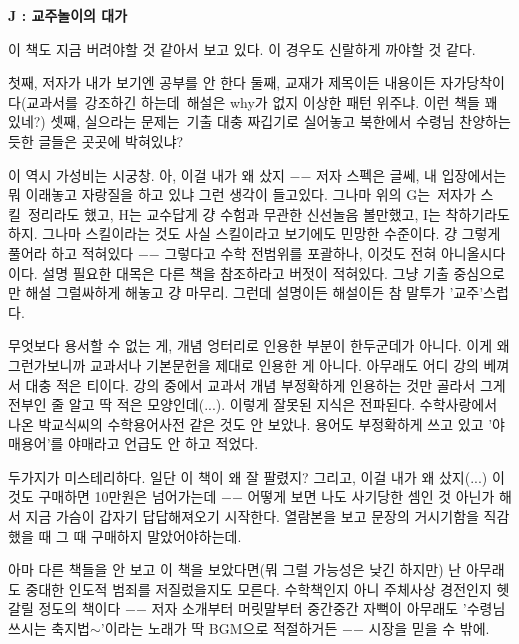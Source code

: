 \textbf{J : 교주놀이의 대가}
\vspace{5mm}

이 책도 지금 버려야할 것 같아서 보고 있다.
이 경우도 신랄하게 까야할 것 같다.
\vspace{5mm}

첫째, 저자가 내가 보기엔 공부를 안 한다
둘째, 교재가 제목이든 내용이든 자가당착이다(교과서를 강조하긴 하는데 해설은 why가 없지 이상한 패턴 위주냐. 이런 책들 꽤 있네?)
셋째, 실으라는 문제는 기출 대충 짜깁기로 실어놓고 북한에서 수령님 찬양하는 듯한 글들은 곳곳에 박혀있냐?
\vspace{5mm}

이 역시 가성비는 시궁창. 아, 이걸 내가 왜 샀지 $-$$-$
저자 스펙은 글쎄, 내 입장에서는 뭐 이래놓고 자랑질을 하고 있냐 그런 생각이 들고있다.
그나마 위의 G는 저자가 스킬 정리라도 했고, H는 교수답게 걍 수험과 무관한 신선놀음 볼만했고, I는 착하기라도 하지.
그나마 스킬이라는 것도 사실 스킬이라고 보기에도 민망한 수준이다. 걍 그렇게 풀어라 하고 적혀있다 $-$$-$
그렇다고 수학 전범위를 포괄하나, 이것도 전혀 아니올시다이다. 설명 필요한 대목은 다른 책을 참조하라고 버젓이 적혀있다.
그냥 기출 중심으로만 해설 그럴싸하게 해놓고 걍 마무리. 그런데 설명이든 해설이든 참 말투가 '교주'스럽다.
\vspace{5mm}

무엇보다 용서할 수 없는 게, 개념 엉터리로 인용한 부분이 한두군데가 아니다.
이게 왜 그런가보니까 교과서나 기본문헌을 제대로 인용한 게 아니다. 아무래도 어디 강의 베껴서 대충 적은 티이다.
강의 중에서 교과서 개념 부정확하게 인용하는 것만 골라서 그게 전부인 줄 알고 딱 적은 모양인데(...). 이렇게 잘못된 지식은 전파된다.
수학사랑에서 나온 박교식씨의 수학용어사전 같은 것도 안 보았나. 용어도 부정확하게 쓰고 있고 '야매용어'를 야매라고 언급도 안 하고 적었다.
\vspace{5mm}

두가지가 미스테리하다. 일단 이 책이 왜 잘 팔렸지? 그리고, 이걸 내가 왜 샀지(...) 이것도 구매하면 10만원은 넘어가는데 $-$$-$
어떻게 보면 나도 사기당한 셈인 것 아닌가 해서 지금 가슴이 갑자기 답답해져오기 시작한다.
열람본을 보고 문장의 거시기함을 직감했을 때 그 때 구매하지 말았어야하는데.
\vspace{5mm}

아마 다른 책들을 안 보고 이 책을 보았다면(뭐 그럴 가능성은 낮긴 하지만) 난 아무래도 중대한 인도적 범죄를 저질렀을지도 모른다.
수학책인지 아니 주체사상 경전인지 헷갈릴 정도의 책이다 $-$$-$
저자 소개부터 머릿말부터 중간중간 자뻑이 아무래도 '수령님 쓰시는 축지법$\sim$'이라는 노래가 딱 BGM으로 적절하거든 $-$$-$
시장을 믿을 수 밖에.
\vspace{5mm}

